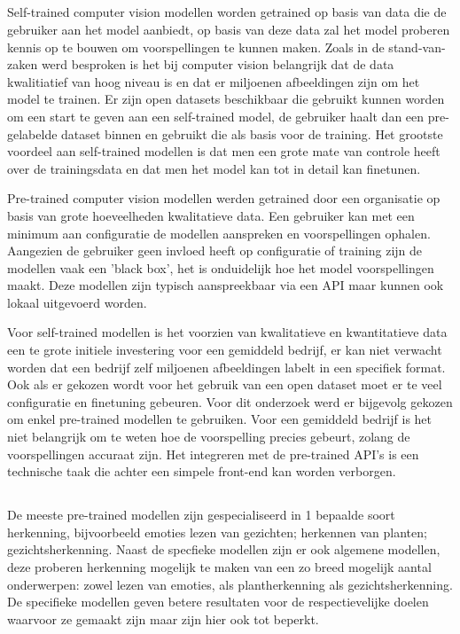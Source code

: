 \subsection{}
\label{sec:Self-trained-versus-pre-trained}
Self-trained computer vision modellen worden getrained op basis van data die de gebruiker aan het model aanbiedt, op basis van deze data zal het model proberen kennis op te bouwen om voorspellingen te kunnen maken. Zoals in de stand-van-zaken werd besproken is het bij computer vision belangrijk dat de data kwalitiatief van hoog niveau is en dat er miljoenen afbeeldingen zijn om het model te trainen. Er zijn open datasets beschikbaar die gebruikt kunnen worden om een start te geven aan een self-trained model, de gebruiker haalt dan een pre-gelabelde dataset binnen en gebruikt die als basis voor de training. Het grootste voordeel aan self-trained modellen is dat men een grote mate van controle heeft over de trainingsdata en dat men het model kan tot in detail kan finetunen. 

Pre-trained computer vision modellen werden getrained door een organisatie op basis van grote hoeveelheden kwalitatieve data. Een gebruiker kan met een minimum aan configuratie de modellen aanspreken en voorspellingen ophalen. Aangezien de gebruiker geen invloed heeft op configuratie of training zijn de modellen vaak een 'black box', het is onduidelijk hoe het model voorspellingen maakt. Deze modellen zijn typisch aanspreekbaar via een API maar kunnen ook lokaal uitgevoerd worden.

Voor self-trained modellen is het voorzien van kwalitatieve en kwantitatieve data een te grote initiele investering voor een gemiddeld bedrijf, er kan niet verwacht worden dat een bedrijf zelf miljoenen afbeeldingen labelt in een specifiek format. Ook als er gekozen wordt voor het gebruik van een open dataset moet er te veel configuratie en finetuning gebeuren. Voor dit onderzoek werd er bijgevolg gekozen om enkel pre-trained modellen te gebruiken. Voor een gemiddeld bedrijf is het niet belangrijk om te weten hoe de voorspelling precies gebeurt, zolang de voorspellingen accuraat zijn. Het integreren met de pre-trained API's is een technische taak die achter een simpele front-end kan worden verborgen.

\subsection{}
\label{sec:specific-versus-general}
De meeste pre-trained modellen zijn gespecialiseerd in 1 bepaalde soort herkenning, bijvoorbeeld emoties lezen van gezichten; herkennen van planten; gezichtsherkenning. Naast de specfieke modellen zijn er ook algemene modellen, deze proberen herkenning mogelijk te maken van een zo breed mogelijk aantal onderwerpen: zowel lezen van emoties, als plantherkenning als gezichtsherkenning. De specifieke modellen geven betere resultaten voor de respectievelijke doelen waarvoor ze gemaakt zijn maar zijn hier ook tot beperkt.


